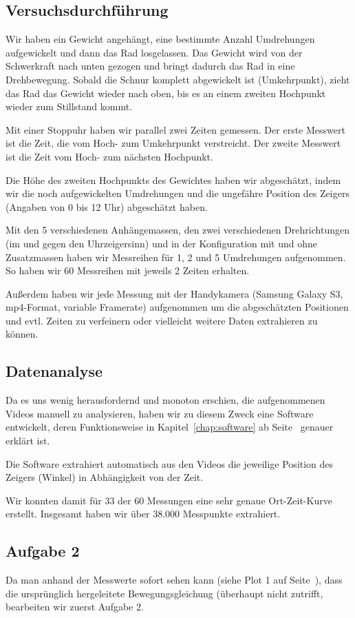 \documentclass[a4paper,german,12pt,smallheadings]{scrartcl}
\begin{document}
\subsection{Versuchsdurchführung}

Wir haben ein Gewicht angehängt, eine bestimmte Anzahl Umdrehungen aufgewickelt
und dann das Rad losgelassen. Das Gewicht wird von der Schwerkraft nach unten
gezogen und bringt dadurch das Rad in eine Drehbewegung. Sobald die Schnur
komplett abgewickelt ist (Umkehrpunkt), zieht das Rad das Gewicht wieder nach
oben, bis es an einem zweiten Hochpunkt wieder zum Stillstand kommt.

Mit einer Stoppuhr haben wir parallel zwei Zeiten gemessen. Der erste Messwert
ist die Zeit, die vom Hoch- zum Umkehrpunkt verstreicht. Der zweite Messwert ist
die Zeit vom Hoch- zum nächsten Hochpunkt.

Die Höhe des zweiten Hochpunkts des Gewichtes haben wir abgeschätzt, indem wir
die noch aufgewickelten Umdrehungen und die ungefähre Position des Zeigers
(Angaben von 0 bis 12 Uhr) abgeschätzt haben.

Mit den 5 verschiedenen Anhängemassen, den zwei verschiedenen Drehrichtungen
(im und gegen den Uhrzeigersinn) und in der Konfiguration mit und ohne
Zusatzmassen haben wir Messreihen für 1, 2 und 5 Umdrehungen aufgenommen. So
haben wir 60 Messreihen mit jeweils 2 Zeiten erhalten.

Außerdem haben wir jede Messung mit der Handykamera (Samsung Galaxy S3,
mp4-Format, variable Framerate) aufgenommen um die abgeschätzten Positionen und
evtl. Zeiten zu verfeinern oder vielleicht weitere Daten extrahieren zu können.

\subsection{Datenanalyse}
Da es uns wenig herausfordernd und monoton erschien, die aufgenommenen Videos
manuell zu analysieren, haben wir zu diesem Zweck eine Software entwickelt,
deren Funktionsweise in Kapitel~\ref{chap:software} ab
Seite~\pageref{chap:software} genauer erklärt ist.

Die Software extrahiert automatisch aus den Videos die jeweilige Position des
Zeigers (Winkel) in Abhängigkeit von der Zeit.

Wir konnten damit für 33 der 60 Messungen eine sehr genaue Ort-Zeit-Kurve
erstellt. Insgesamt haben wir über 38.000 Messpunkte extrahiert.

\subsection{Aufgabe 2}
Da man anhand der Messwerte sofort sehen kann (siehe Plot 1 auf
Seite~\pageref{plot:57-lin}), dass die ursprünglich hergeleitete
Bewegungsgleichung (überhaupt nicht zutrifft, bearbeiten wir zuerst Aufgabe 2.
\end{document}
